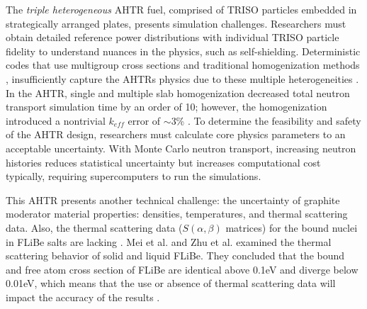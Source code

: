 The \emph{triple heterogeneous} \gls{AHTR} fuel, comprised of \gls{TRISO} 
particles embedded in strategically arranged plates, presents simulation 
challenges. 
Researchers must obtain detailed reference power distributions with individual 
\gls{TRISO} particle fidelity to understand nuances in the physics, such 
as self-shielding.
Deterministic codes that use multigroup cross sections and traditional 
homogenization methods \cite{ramey_monte_2018}, insufficiently capture the 
\glspl{AHTR} physics due to these multiple heterogeneities 
\cite{ramey_monte_2018}. 
In the \gls{AHTR}, single and multiple slab homogenization decreased total 
neutron transport simulation time by an order of 10; however, the homogenization 
introduced a nontrivial $k_{eff}$ error of $\sim$3\% 
\cite{ramey_monte_2018,cisneros_neutronics_2012}.
To determine the feasibility and safety of the \gls{AHTR} design, researchers 
must calculate core physics parameters to an acceptable uncertainty. 
With Monte Carlo neutron transport, increasing neutron histories reduces statistical 
uncertainty but increases computational cost typically, requiring
supercomputers to run the simulations.

This \gls{AHTR} presents another technical challenge: the uncertainty of 
graphite moderator material properties: densities, temperatures, and thermal 
scattering data.
Also, the thermal scattering data ($S(\alpha,\beta)$ matrices) for 
the bound nuclei in \gls{FLiBe} salts are lacking \cite{ramey_monte_2018}. 
Mei et al. \cite{mei_investigation_2013} and Zhu et al. \cite{zhu_thermal_2017} 
examined the thermal scattering behavior of solid and liquid \gls{FLiBe}.
They concluded that the bound and free atom cross section of \gls{FLiBe} are 
identical above 0.1eV and diverge below 0.01eV, which means that the use or 
absence of thermal scattering data will impact the accuracy of the results 
\cite{ramey_monte_2018}. 

